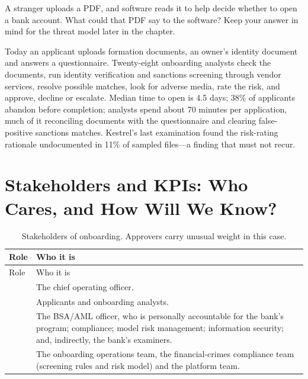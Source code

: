 \begin{thinkabout}
A stranger uploads a PDF, and software reads it to help decide whether to open a bank account. What could that PDF say to the software? Keep your answer in mind for the threat model later in the chapter.
\end{thinkabout}

Today an applicant uploads formation documents, an owner's identity document and answers a questionnaire. Twenty-eight onboarding analysts check the documents, run identity verification and sanctions screening through vendor services, resolve possible matches, look for adverse media, rate the risk, and approve, decline or escalate. Median time to open is 4.5 days; 38\% of applicants abandon before completion; analysts spend about 70 minutes per application, much of it reconciling documents with the questionnaire and clearing false-positive sanctions matches. Kestrel's last examination found the risk-rating rationale undocumented in 11\% of sampled files---a finding that must not recur.

\section{Stakeholders and KPIs: Who Cares, and How Will We Know?}
\label{sec:kyc-kpis}

\begingroup
\small
\begin{xltabular}{\textwidth}{@{}>{\raggedright\arraybackslash}p{2.0cm}>{\raggedright\arraybackslash}X@{}}
\caption{Stakeholders of onboarding. Approvers carry unusual weight in this case.}\label{tab:kyc-stakeholders}\\
\toprule
{} Role & Who it is \\
\midrule
\endfirsthead
\toprule
{} Role & Who it is \\
\midrule
\endhead
{} & The chief operating officer. \\
 & Applicants and onboarding analysts. \\
 & The BSA/AML officer, who is personally accountable for the bank's program; compliance; model risk management; information security; and, indirectly, the bank's examiners. \\
 & The onboarding operations team, the financial-crimes compliance team (screening rules and risk model) and the platform team. \\
\bottomrule
\end{xltabular}
\endgroup

